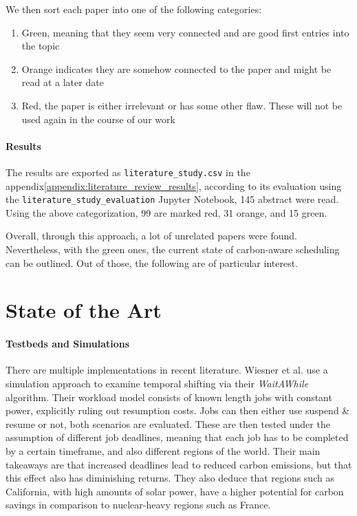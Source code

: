We then sort each paper into one of the following categories:

\begin{enumerate}
    \item Green, meaning that they seem very connected and are good first entries into the topic
    \item Orange indicates they are somehow connected to the paper and might be read at a later date
    \item Red, the paper is either irrelevant or has some other flaw. These will not be used again in the course of our work
\end{enumerate}

\paragraph{Results}

The results are exported as \verb|literature_study.csv| in the appendix\ref{appendix:literature_review_results}, according to its evaluation using the \verb|literature_study_evaluation| Jupyter Notebook, 145 abstract were read. 
Using the above categorization, 99 are marked red, 31 orange, and 15 green.

Overall, through this approach, a lot of unrelated papers were found.
Nevertheless, with the green ones, the current state of carbon-aware scheduling can be outlined.
Out of those, the following are of particular interest.

\section{State of the Art}

\paragraph{Testbeds and Simulations}
There are multiple implementations in recent literature. Wiesner et al. \cite{wiesner_lets_2021} use a simulation approach to examine temporal shifting via their \emph{WaitAWhile} algorithm. Their workload model consists of known length jobs with constant power, explicitly ruling out resumption costs. 
Jobs can then either use suspend \& resume or not, both scenarios are evaluated. 
These are then tested under the assumption of different job deadlines, meaning that each job has to be completed by a certain timeframe, and also different regions of the world.
Their main takeaways are that increased deadlines lead to reduced carbon emissions, but that this effect also has diminishing returns. 
They also deduce that regions such as California, with high amounts of solar power, have a higher potential for carbon savings in comparison to nuclear-heavy regions such as France.

